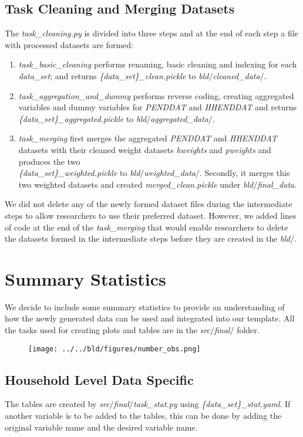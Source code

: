 \documentclass[11pt, a4paper, leqno]{article}
\begin{document}
\subsection{Task Cleaning and Merging Datasets}
The  \emph{task\_cleaning.py} is divided into three steps and at the end of each step a file with processed datasets are formed:
\begin{enumerate}
\item   \emph{task\_basic\_cleaning} performs renaming, basic cleaning and indexing for each  \emph{data\_set}; and returns  \emph{\{data\_set\}\_clean.pickle} to  \emph{bld$/$cleaned\_data$/$}.
\item  \emph{task\_aggregation\_and\_dummy} performs reverse coding, creating aggregated variables and dummy variables for  \emph{PENDDAT} and  \emph{HHENDDAT} and returns\\
 \emph{\{data\_set\}\_aggregated.pickle} to  \emph{bld$/$aggregated\_data$/$}.
\item  \emph{task\_merging} first merges the aggregated  \emph{PENDDAT} and  \emph{HHENDDAT} datasets with their cleaned weight datasets  \emph{hweights} and  \emph{pweights} and produces the two\\  \emph{\{data\_set\}\_weighted.pickle} to  \emph{bld$/$weighted\_data$/$}. Secondly, it merges this two weighted datasets and created  \emph{merged\_clean.pickle} under  \emph{bld$/$final\_data}.
\end{enumerate}
We did not delete any of the newly formed dataset files during the intermediate steps to allow researchers to use their preferred dataset. However, we added lines of code at the end of the  \emph{task\_merging} that would enable researchers to delete the datasets formed in the intermediate steps before they are created in the  \emph{bld$/$}.
\clearpage
\section{Summary Statistics}\label{section:stats}
We decide to include some summary statistics to provide an understanding of how the newly generated data can be used and integrated into our template. All the tasks used for creating plots and tables are in the \emph{src$/$final$/$} folder.\\[12pt]
\begin{figure}[htbp]
    \centerline{\texttt{[image: ../../bld/figures/number\_obs.png]}}
    \end{figure}
\clearpage
\subsection{Household Level Data Specific}
The tables are created by \emph{src$/$final$/$task\_stat.py} using  \emph{\{data\_set\}\_stat.yaml}. If another variable is to be added to the tables, this can be done by adding the original variable name and the desired variable name.
\begin{footnotesize}
\begin{center}

\end{center}
\end{footnotesize}
\end{document}
